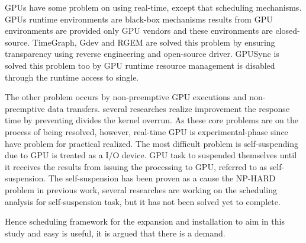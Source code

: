 GPUs have some problem on using real-time, except that scheduling mechanisms.
GPUs runtime environments are black-box mechanisms results from GPU environments are provided only GPU vendors and these environments are closed-source.
TimeGraph, Gdev and RGEM are solved this problem by ensuring transparency using reverse engineering and open-source driver.
GPUSync is solved this problem too by GPU runtime resource management is disabled through the runtime access to single.

The other problem occurs by non-preemptive GPU executions and non-preemptive data transfers.
several researches\cite{basaran:preemptive,sparc} realize improvement  the response time by preventing divides the kernel overrun.
As these core problems are on the process of being resolved, however, real-time GPU is experimental-phase since have problem for practical realized.
The most difficult problem is self-suspending due to GPU is treated as a I/O device.
GPU task to suspended themselves until it receives the results from issuing the processing to GPU, referred to as self-suspension.
The self-suspension has been proven as a cause the NP-HARD problem in previous work\cite{self-sus:1,self-sus:2},
several researches\cite{chattopadhyay2014limited, kim2013segment} are working on the scheduling analysis for self-suspension task, but it has not been solved yet to complete.

Hence scheduling framework for the expansion and installation to aim in this study and easy is useful,
it is argued that there is a demand.

